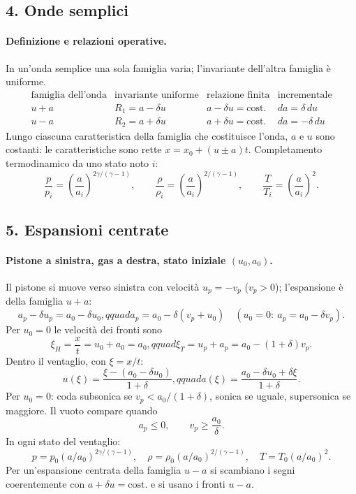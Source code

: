 \documentclass[11pt,a4paper]{article}
\begin{document}

\subsection*{4. Onde semplici}

\paragraph*{Definizione e relazioni operative.}
In un'onda semplice una sola famiglia varia; l'invariante dell'altra famiglia è uniforme.
\[
\begin{array}{c|c|c|c}
\text{famiglia dell'onda} & \text{invariante uniforme} & \text{relazione finita} & \text{incrementale}\\ \hline
u+a & R_1=a-\delta u & a-\delta u=\text{cost.} & da=\delta\,du\\
u-a & R_2=a+\delta u & a+\delta u=\text{cost.} & da=-\delta\,du
\end{array}
\]
Lungo ciascuna caratteristica della famiglia che costituisce l'onda, $a$ e $u$ sono
costanti: le caratteristiche sono rette $x=x_0+(u\pm a)t$.
Completamento termodinamico da uno stato noto $i$:
\[
\frac p{p_i}=\left(\frac a{a_i}\right)^{2\gamma/(\gamma-1)},\qquad
\frac\rho{\rho_i}=\left(\frac a{a_i}\right)^{2/(\gamma-1)},\qquad
\frac T{T_i}=\left(\frac a{a_i}\right)^2.
\]

\subsection*{5. Espansioni centrate}

\paragraph*{Pistone a sinistra, gas a destra, stato iniziale $(u_0,a_0)$.}
Il pistone si muove verso sinistra con velocità $u_p=-v_p$ ($v_p>0$); l'espansione è
della famiglia $u+a$:
\[
a_p-\delta u_p=a_0-\delta u_0,qquad
a_p=a_0-\delta(v_p+u_0)\quad (u_0=0:\ a_p=a_0-\delta v_p).
\]
Per $u_0=0$ le velocità dei fronti sono
\[
\xi_H=\frac xt=u_0+a_0=a_0,qquad
\xi_T=u_p+a_p=a_0-(1+\delta)v_p.
\]
Dentro il ventaglio, con $\xi=x/t$:
\[
u(\xi)=\frac{\xi-(a_0-\delta u_0)}{1+\delta},qquad
a(\xi)=\frac{a_0-\delta u_0+\delta\xi}{1+\delta}.
\]
Per $u_0=0$: coda subsonica se $v_p<a_0/(1+\delta)$, sonica se uguale,
supersonica se maggiore. Il vuoto compare quando
\[
a_p\le0,\qquad v_p\ge\frac{a_0}{\delta}.
\]
In ogni stato del ventaglio:
\[
p=p_0(a/a_0)^{2\gamma/(\gamma-1)},\quad
\rho=\rho_0(a/a_0)^{2/(\gamma-1)},\quad T=T_0(a/a_0)^2.
\]
Per un'espansione centrata della famiglia $u-a$ si scambiano i segni coerentemente
con $a+\delta u=\text{cost.}$ e si usano i fronti $u-a$.
\end{document}
